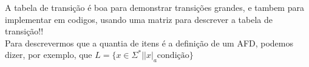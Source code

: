 \documentclass[12pt]{article}
\begin{document}
\begin{itemize}
\begin{itemize}
\begin{itemize}
\begin{itemize}
\begin{table}[H]
\begin{tabular}{|c|ccc|}
                        \hline
                    \end{tabular}
                \end{table}
                A tabela de transição é boa para demonstrar transições 
                grandes, e tambem para implementar em codigos, usando uma 
                matriz para descrever a tabela de transição!! \\
                Para descrevermos que a quantia de itens é a definição de 
                um AFD, podemos dizer, por exemplo, que 
                $L=\{x \in \Sigma^* | |x|_a \text{condição} \}$
                \end{itemize}
            \end{itemize}
        \end{itemize}
    \end{itemize}
\end{document}
